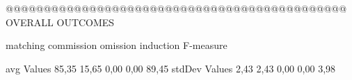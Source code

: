 @@@@@@@@@@@@@@@@@@@@@@@@@@@@@@@@@@@@@@@@@@@@@ OVERALL OUTCOMES

               matching commission   omission  induction  F-measure
               
avg Values      85,35     15,65      0,00        0,00      89,45        
stdDev Values    2,43       2,43     0,00        0,00       3,98        